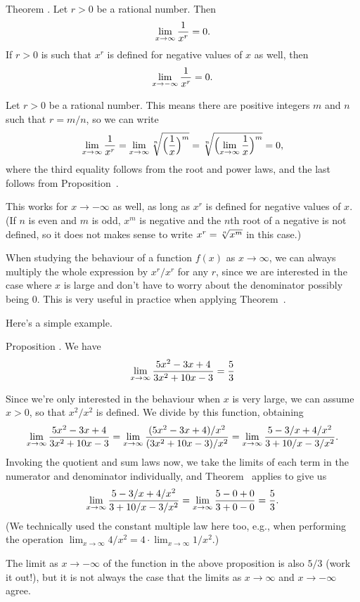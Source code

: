 \edef\thminfratpower{\the\thmcount}
\proclaim Theorem \advthm. Let $r>0$ be a rational number. Then
$$\lim_{x\to \infty} {1\over x^r} = 0.$$
If $r>0$ is such that $x^r$ is defined for negative values of $x$ as well, then
$$\lim_{x\to -\infty} {1\over x^r} = 0.$$

\proof Let $r>0$ be a rational number. This means there are positive integers $m$ and $n$ such that
$r = m/n$, so we can write
$$\lim_{x\to \infty} {1\over x^r} = \lim_{x\to \infty} \root n\of{\Bigl({1\over x}\Bigr)^m}
=\root n\of{\Bigl(\lim_{x\to \infty} {1\over x} \Bigr)^m} = 0,$$
where the third equality follows from the root and power laws, and the last follows from
Proposition~{\prophorasymp}.

This works for $x\to-\infty$ as well, as long as $x^r$ is defined for negative values of $x$. (If
$n$ is even and $m$ is odd, $x^m$ is negative and the $n$th root of a negative is not defined,
so it does not makes sense to write $x^r = \root n\of {x^m}$ in this case.)\slug

When studying the behaviour of a function $f(x)$ as $x\to\infty$, we can always multiply the whole
expression by $x^r/x^r$ for any $r$, since we are interested in the case where $x$ is large and don't
have to worry about the denominator possibly being $0$. This is very useful in practice when applying
Theorem~{\thminfratpower}.

Here's a simple example.

\proclaim {} Proposition \advthm. We have
$$\lim_{x\to \infty} {5x^2 - 3x + 4\over 3x^2 + 10x-3} = {5\over 3}$$

\proof Since we're only interested in the behaviour when $x$ is very large, we can assume $x>0$, so that
$x^2/x^2$ is defined. We divide by this function, obtaining
$$\lim_{x\to \infty} {5x^2 - 3x + 4\over 3x^2 + 10x-3}
=\lim_{x\to \infty} {(5x^2 - 3x + 4)/x^2\over (3x^2 + 10x-3)/x^2}
=\lim_{x\to \infty} {5- 3/x + 4/x^2\over 3 + 10/x-3/x^2}.$$
Invoking the quotient and sum laws now, we take the limits of each term in the numerator and denominator
individually, and Theorem~{\thminfratpower} applies to give us
$$\lim_{x\to \infty} {5- 3/x + 4/x^2\over 3 + 10/x-3/x^2}
=\lim_{x\to \infty} {5-0 + 0\over 3 + 0-0} = {5\over 3}.$$
(We technically used the constant multiple law here too, e.g., when performing the operation
$\lim_{x\to\infty} 4/x^2 = 4\cdot\lim_{x\to\infty} 1/x^2$.)\slug

The limit as $x\to-\infty$ of the function in the above proposition is also $5/3$ (work it out!),
but it is not always the case that the limits as $x\to\infty$ and $x\to-\infty$ agree.

